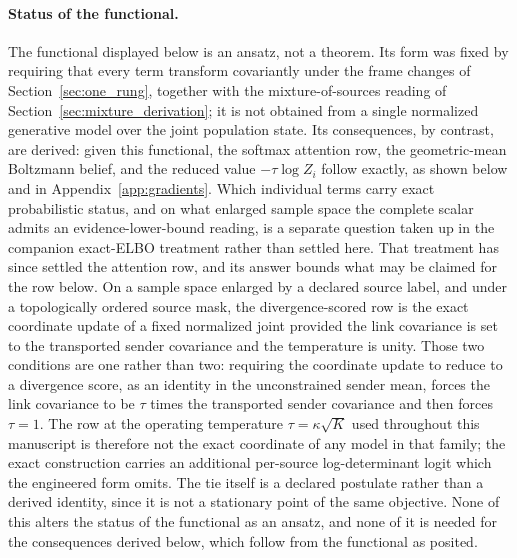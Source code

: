 \documentclass[11pt]{article}
\begin{document}
\paragraph{Status of the functional.} The functional displayed below is an ansatz, not a theorem. Its form was fixed by requiring that every term transform covariantly under the frame changes of Section~\ref{sec:one_rung}, together with the mixture-of-sources reading of Section~\ref{sec:mixture_derivation}; it is not obtained from a single normalized generative model over the joint population state. Its consequences, by contrast, are derived: given this functional, the softmax attention row, the geometric-mean Boltzmann belief, and the reduced value $-\tau \log Z_i$ follow exactly, as shown below and in Appendix~\ref{app:gradients}. Which individual terms carry exact probabilistic status, and on what enlarged sample space the complete scalar admits an evidence-lower-bound reading, is a separate question taken up in the companion exact-ELBO treatment rather than settled here. That treatment has since settled the attention row, and its answer bounds what may be claimed for the row below. On a sample space enlarged by a declared source label, and under a topologically ordered source mask, the divergence-scored row is the exact coordinate update of a fixed normalized joint provided the link covariance is set to the transported sender covariance and the temperature is unity. Those two conditions are one rather than two: requiring the coordinate update to reduce to a divergence score, as an identity in the unconstrained sender mean, forces the link covariance to be $\tau$ times the transported sender covariance and then forces $\tau = 1$. The row at the operating temperature $\tau = \kappa\sqrt{K}$ used throughout this manuscript is therefore not the exact coordinate of any model in that family; the exact construction carries an additional per-source log-determinant logit which the engineered form omits. The tie itself is a declared postulate rather than a derived identity, since it is not a stationary point of the same objective. None of this alters the status of the functional as an ansatz, and none of it is needed for the consequences derived below, which follow from the functional as posited.
\end{document}

